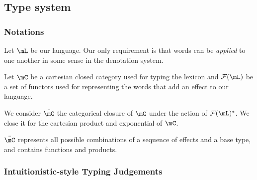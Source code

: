 \documentclass[math, english, info]{beamercours}
\begin{document}
\subsection{Type system}
\begin{frame}
	\frametitle{Notations}
	Let $\mL$ be our language.
	Our only requirement is that words can be \textit{applied} to one another in
	some sense in the	denotation system.

	\pause
	\medskip

	Let $\mC$ be a cartesian closed category used for typing the lexicon and
	$\mathcal{F}(\mL)$ be a set of functors used for representing the words
	that add an effect to our language.

	\pause
	\smallskip

	We consider $\bar{\mC}$ the categorical closure of $\mC$ under the action
	of $\mathcal{F}(\mL)^{*}$.
	We close it for the cartesian product and exponential of $\mC$.

	$\bar{\mC}$ represents all possible combinations of a sequence of effects
	and a base type, and contains functions and products.
\end{frame}

\begin{frame}[fragile]
	\frametitle{Intuitionistic-style Typing Judgements}
\end{frame}
\end{document}
